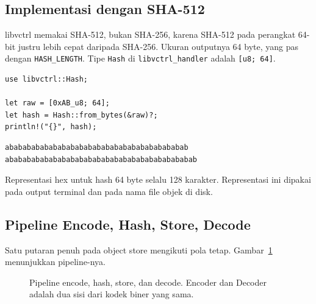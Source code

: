 \documentclass[11pt,a4paper]{article}
\begin{document}
\subsection{Implementasi dengan SHA-512}

libvctrl memakai SHA-512, bukan SHA-256, karena SHA-512 pada perangkat 64-bit justru lebih cepat daripada SHA-256. Ukuran outputnya 64 byte, yang pas dengan \texttt{HASH\_LENGTH}. Tipe \texttt{Hash} di \texttt{libvctrl\_handler} adalah \texttt{[u8; 64]}.

\begin{lstlisting}[style=code]
use libvctrl::Hash;

let raw = [0xAB_u8; 64];
let hash = Hash::from_bytes(&raw)?;
println!("{}", hash);
\end{lstlisting}

\begin{lstlisting}[style=out]
ababababababababababababababababababababab
abababababababababababababababababababababab
\end{lstlisting}

Representasi hex untuk hash 64 byte selalu 128 karakter. Representasi ini dipakai pada output terminal dan pada nama file objek di disk.

\subsection{Pipeline Encode, Hash, Store, Decode}

Satu putaran penuh pada object store mengikuti pola tetap. Gambar~\ref{fig:roundtrip} menunjukkan pipeline-nya.

\begin{figure}[H]
	\centering
	\caption{Pipeline encode, hash, store, dan decode. Encoder dan Decoder adalah dua sisi dari kodek biner yang sama.}
	\label{fig:roundtrip}
\end{figure}
\end{document}
